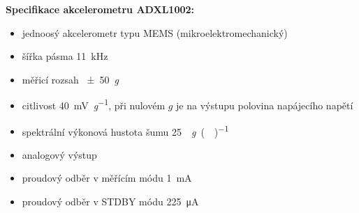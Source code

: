     \pagebreak
    
    \textbf{Specifikace akcelerometru ADXL1002:} \cite{manual:3}
        \begin{itemize}
            \item jednoosý akcelerometr typu MEMS (mikroelektromechanický)
            \item šířka pásma \SI{11}{\kilo Hz}
            \item měřicí rozsah \SI{\pm 50}{\textit{g}}
            \item citlivost \SI{40}{\milli V\textit{g}^{-1}}, při nulovém $g$ je na výstupu polovina napájecího napětí
            \item spektrální výkonová hustota šumu \SI{25}{\micro \textit{g}()^{-1}}
            \item analogový výstup
            \item proudový odběr v měřícím módu \SI{1}{\milli\ampere}
            \item proudový odběr v STDBY módu  \SI{225}{\micro\ampere}
        \end{itemize}
        
